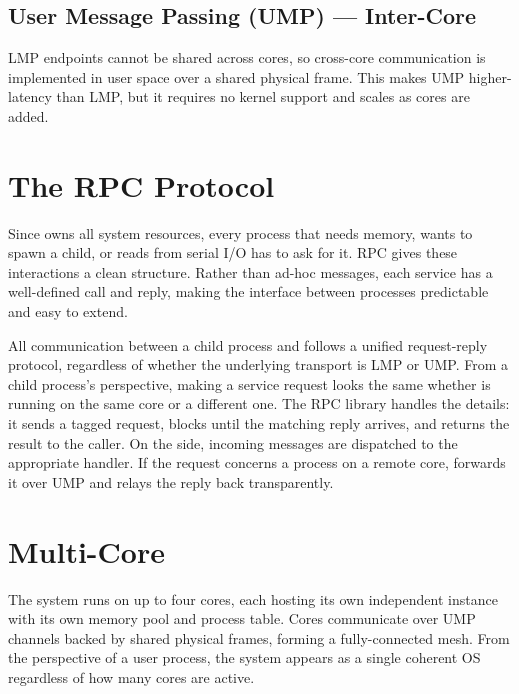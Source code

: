 \subsection{User Message Passing (UMP) --- Inter-Core}

LMP endpoints cannot be shared across cores, so cross-core communication is
implemented in user space over a shared physical frame. This makes UMP
higher-latency than LMP, but it requires no kernel support and scales as cores
are added.

\section{The RPC Protocol}

Since  owns all system resources, every process that needs memory,
wants to spawn a child, or reads from serial I/O has to ask  for it.
RPC gives these interactions a clean structure. Rather than ad-hoc messages,
each service has a well-defined call and reply, making the interface between
processes predictable and easy to extend.

\medskip\noindent
All communication between a child process and  follows a unified
request-reply protocol, regardless of whether the underlying transport is LMP
or UMP. From a child process's perspective, making a service request looks the
same whether  is running on the same core or a different one. The RPC
library handles the details: it sends a tagged request, blocks until the
matching reply arrives, and returns the result to the caller. On the 
side, incoming messages are dispatched to the appropriate handler. If the
request concerns a process on a remote core,  forwards it over UMP and
relays the reply back transparently.

\section{Multi-Core}

The system runs on up to four cores, each hosting its own independent
 instance with its own memory pool and process table.  Cores
communicate over UMP channels backed by shared physical frames, forming a
fully-connected mesh. From the perspective of a user process, the
system appears as a single coherent OS regardless of how many cores are active.

